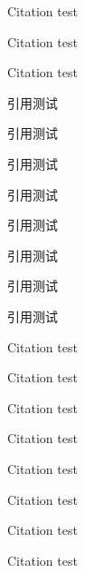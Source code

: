 \documentclass[degree=doctor,fontset=fandol]{ustcthesis}
\begin{document}
\START
\showoutput

Citation \cite{baker1995future} test\par
Citation \cite{baker1995future} test\par
Citation \cite{baker1995future} test\par

引用\citet{yangzongying1996dianzi}测试\par
引用\citet[42]{yangzongying1996dianzi}测试\par
引用\citep{yangzongying1996dianzi}测试\par
引用\citep[42]{yangzongying1996dianzi}测试\par
引用\citep[见][]{yangzongying1996dianzi}测试\par
引用\citep[见][42]{yangzongying1996dianzi}测试\par
引用\citet*{yangzongying1996dianzi}测试\par
引用\citep*{yangzongying1996dianzi}测试\par

Citation \citet{baker1995future} test\par
Citation \citet[42]{baker1995future} test\par
Citation \citep{baker1995future} test\par
Citation \citep[42]{baker1995future} test\par
Citation \citep[see][]{baker1995future} test\par
Citation \citep[see][42]{baker1995future} test\par
Citation \citet*{baker1995future} test\par
Citation \citep*{baker1995future} test\par

\nocite{*}

\backmatter
\printbibliography

\clearpage
\OMIT
\end{document}
